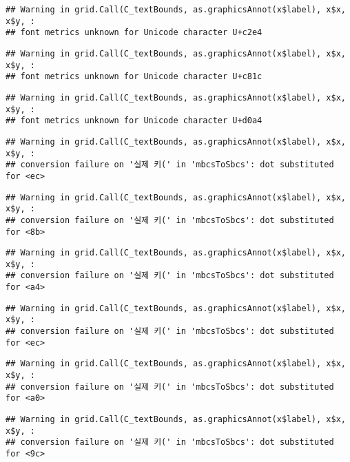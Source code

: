 \documentclass[]{book}
\begin{document}
\begin{verbatim}
## Warning in grid.Call(C_textBounds, as.graphicsAnnot(x$label), x$x, x$y, :
## font metrics unknown for Unicode character U+c2e4
\end{verbatim}

\begin{verbatim}
## Warning in grid.Call(C_textBounds, as.graphicsAnnot(x$label), x$x, x$y, :
## font metrics unknown for Unicode character U+c81c
\end{verbatim}

\begin{verbatim}
## Warning in grid.Call(C_textBounds, as.graphicsAnnot(x$label), x$x, x$y, :
## font metrics unknown for Unicode character U+d0a4
\end{verbatim}

\begin{verbatim}
## Warning in grid.Call(C_textBounds, as.graphicsAnnot(x$label), x$x, x$y, :
## conversion failure on '실제 키(' in 'mbcsToSbcs': dot substituted for <ec>
\end{verbatim}

\begin{verbatim}
## Warning in grid.Call(C_textBounds, as.graphicsAnnot(x$label), x$x, x$y, :
## conversion failure on '실제 키(' in 'mbcsToSbcs': dot substituted for <8b>
\end{verbatim}

\begin{verbatim}
## Warning in grid.Call(C_textBounds, as.graphicsAnnot(x$label), x$x, x$y, :
## conversion failure on '실제 키(' in 'mbcsToSbcs': dot substituted for <a4>
\end{verbatim}

\begin{verbatim}
## Warning in grid.Call(C_textBounds, as.graphicsAnnot(x$label), x$x, x$y, :
## conversion failure on '실제 키(' in 'mbcsToSbcs': dot substituted for <ec>
\end{verbatim}

\begin{verbatim}
## Warning in grid.Call(C_textBounds, as.graphicsAnnot(x$label), x$x, x$y, :
## conversion failure on '실제 키(' in 'mbcsToSbcs': dot substituted for <a0>
\end{verbatim}

\begin{verbatim}
## Warning in grid.Call(C_textBounds, as.graphicsAnnot(x$label), x$x, x$y, :
## conversion failure on '실제 키(' in 'mbcsToSbcs': dot substituted for <9c>
\end{verbatim}
\end{document}
